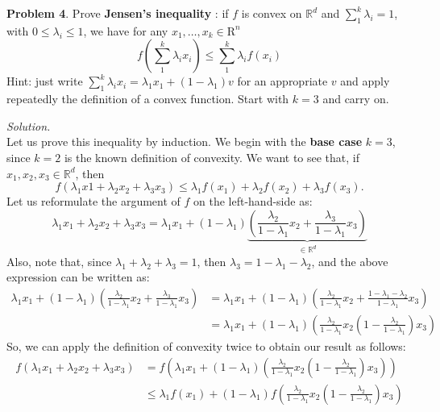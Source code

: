 \documentclass[a4paper]{article}
\newenvironment{problem}[2][Problem]
    { \begin{mdframed}[backgroundcolor=gray!20] \vspace*{0.1cm} \textbf{#1 #2}.}
    {  \end{mdframed}\vspace{0.3cm}}
\newenvironment{solution}
    {\textit{Solution.}\\}
    {}
\newcommand{\R}{\mathbb R}
\begin{document}
\begin{problem}{4}
Prove \textbf{Jensen's inequality} : if \(f\) is convex on \(\R^{d}\) and \(\sum_{1}^{k} \lambda_{i}=1\), with \(0 \leq \lambda_{i} \leq 1\), we have for any \(x_{1}, \ldots, x_{k} \in \mathrm{R}^{n}\)
\[
  f\left(\sum_{1}^{k} \lambda_{i} x_{i}\right) \leq \sum_{1}^{k} \lambda_{i} f\left(x_{i}\right)
\]
Hint: just write \(\sum_{1}^{k} \lambda_{i} x_{i}=\lambda_{1} x_{1}+\left(1-\lambda_{1}\right)v\)  for an appropriate \(v\) and apply repeatedly the definition of a convex function. Start with \(k=3\) and carry on.
\end{problem}
\begin{solution}
  Let us prove this inequality by induction. We begin with the \textbf{base case} \(k = 3\), since \(k = 2\) is the known definition of convexity. We want to see that, if \(x_1,x_2,x_3 \in \R^d\), then
  \[
    f\left(\lambda_1 x1 + \lambda_2 x_2 + \lambda_3 x_3\right) \leq \lambda_1 f(x_1) + \lambda_2 f(x_2) + \lambda_3 f(x_3).
  \]
  Let us reformulate the argument of \(f\) on the left-hand-side as:
  \[
    \lambda_1 x_1 + \lambda_2  x_2 + \lambda_3 x_3 = \lambda_1 x_1 + (1-\lambda_1)\underbrace{\left( \frac{\lambda_2}{1-\lambda_1}x_2 + \frac{\lambda_3}{1-\lambda_1}x_3\right)}_{\in \R^d}
  \]
  Also, note that, since \(\lambda_1 + \lambda_2 +\lambda_3 = 1\), then \(\lambda_3 = 1- \lambda_1 - \lambda_2\), and the above expression can be written as:
  \begin{align*}
    \lambda_1 x_1 + (1-\lambda_1)\left( \frac{\lambda_2}{1-\lambda_1}x_2 + \frac{\lambda_3}{1-\lambda_1}x_3\right) & = \lambda_1 x_1 + (1-\lambda_1) \left(\frac{\lambda_2}{1-\lambda_1}x_2 + \frac{1- \lambda_1 - \lambda_2}{1-\lambda_1}x_3\right) \\
                                                                                                                   & = \lambda_1 x_1 + (1-\lambda_1)\left(\frac{\lambda_2}{1-\lambda_1}x_2 \left(1- \frac{\lambda_2}{1-\lambda_1}\right)x_3  \right)
  \end{align*}
  So, we can apply the definition of convexity twice to obtain our result as follows:
  \begin{align*}
    f\left(\lambda_1 x_1 + \lambda_2  x_2 + \lambda_3 x_3 \right) & = f \left( \lambda_1 x_1 + (1-\lambda_1)\left(\frac{\lambda_2}{1-\lambda_1}x_2 \left(1- \frac{\lambda_2}{1-\lambda_1}\right)x_3  \right)\right)          \\
                                                                  & \leq \lambda_1 f(x_1) + (1-\lambda_1)f\left(\frac{\lambda_2}{1-\lambda_1}x_2 \left(1- \frac{\lambda_2}{1-\lambda_1}\right)x_3  \right)                   \\

\end{align*}
\end{solution}
\end{document}
